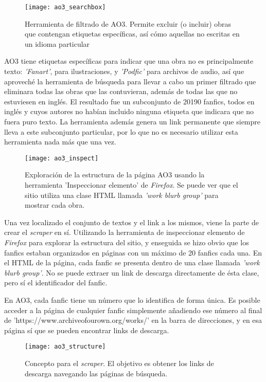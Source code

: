 \documentclass{pre-tfg}
\begin{document}
\begin{SCfigure}
	\label{fig:ao3_search}
	\caption{Herramienta de filtrado de AO3. Permite excluir (o incluir) obras que contengan etiquetas específicas, así cómo aquellas no escritas en un idioma particular}
	\texttt{[image: ao3\_searchbox]}
	\centering
\end{SCfigure}

AO3 tiene etiquetas específicas para indicar que una obra no es principalmente texto: \textit{'Fanart'}, para ilustraciones, y \textit{'Podfic'} para archivos de audio, así que aproveché la herramienta de búsqueda para llevar a cabo un primer filtrado que eliminara todas las obras que las contuvieran, además de todas las que no estuviesen en inglés. El resultado fue un subconjunto de 20190 fanfics, todos en inglés y cuyos autores no habían incluido ninguna etiqueta que indicara que no fuera puro texto. La herramienta además genera un link permanente que siempre lleva a este subconjunto particular, por lo que no es necesario utilizar esta herramienta nada más que una vez.

\begin{figure}
	\label{fig:ao3_inspect}
	\texttt{[image: ao3\_inspect]}
	\caption{Exploración de la estructura de la página AO3 usando la herramienta 'Inspeccionar elemento' de \textit{Firefox}. Se puede ver que el sitio utiliza una clase HTML llamada \textit{'work blurb group'} para mostrar cada obra.}
	\centering
\end{figure} 

Una vez localizado el conjunto de textos y el link a los mismos, viene la parte de crear el \textit{scraper} en sí. Utilizando la herramienta de inspeccionar elemento de \textit{Firefox} para explorar la estructura del sitio, y enseguida se hizo obvio que los fanfics estaban organizados en páginas con un máximo de 20 fanfics cada una. En el HTML de la página, cada fanfic se presenta dentro de una clase llamada \textit{'work blurb group'}. No se puede extraer un link de descarga directamente de ésta clase, pero sí el identificador del fanfic.

En AO3, cada fanfic tiene un número que lo identifica de forma única. Es posible acceder a la página de cualquier fanfic simplemente añadiendo ese número al final de \newline 'https://www.archiveofourown.org/works/' en la barra de direcciones, y en esa página sí que se pueden encontrar links de descarga.

\begin{figure}[h]
	\label{fig:ao3_structure}
	\texttt{[image: ao3\_structure]}
	\caption{Concepto para el \textit{scraper}. El objetivo es obtener los links de descarga navegando las páginas de búsqueda.}
	\centering
\end{figure}
\end{document}
